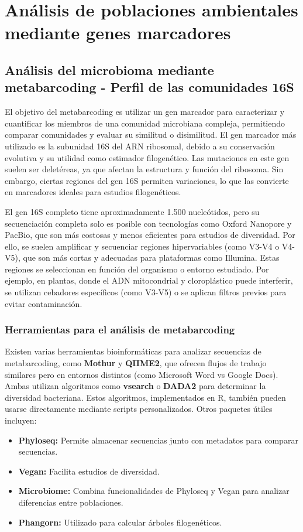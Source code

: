 \chapter{Análisis de poblaciones ambientales mediante genes marcadores}
\section{Análisis del microbioma mediante metabarcoding - Perfil de las comunidades 16S}
El objetivo del metabarcoding es utilizar un gen marcador para caracterizar y cuantificar los miembros de una comunidad microbiana compleja, permitiendo comparar comunidades y evaluar su similitud o disimilitud. El gen marcador más utilizado es la subunidad 16S del ARN ribosomal, debido a su conservación evolutiva y su utilidad como estimador filogenético. Las mutaciones en este gen suelen ser deletéreas, ya que afectan la estructura y función del ribosoma. Sin embargo, ciertas regiones del gen 16S permiten variaciones, lo que las convierte en marcadores ideales para estudios filogenéticos.

El gen 16S completo tiene aproximadamente 1.500 nucleótidos, pero su secuenciación completa solo es posible con tecnologías como Oxford Nanopore y PacBio, que son más costosas y menos eficientes para estudios de diversidad. Por ello, se suelen amplificar y secuenciar regiones hipervariables (como V3-V4 o V4-V5), que son más cortas y adecuadas para plataformas como Illumina. Estas regiones se seleccionan en función del organismo o entorno estudiado. Por ejemplo, en plantas, donde el ADN mitocondrial y cloroplástico puede interferir, se utilizan cebadores específicos (como V3-V5) o se aplican filtros previos para evitar contaminación.

\subsection{Herramientas para el análisis de metabarcoding}
Existen varias herramientas bioinformáticas para analizar secuencias de metabarcoding, como \textbf{Mothur} y \textbf{QIIME2}, que ofrecen flujos de trabajo similares pero en entornos distintos (como Microsoft Word vs Google Docs). Ambas utilizan algoritmos como \textbf{vsearch} o \textbf{DADA2} para determinar la diversidad bacteriana. Estos algoritmos, implementados en R, también pueden usarse directamente mediante scripts personalizados. Otros paquetes útiles incluyen:
\begin{itemize}
\item \textbf{Phyloseq:} Permite almacenar secuencias junto con metadatos para comparar secuencias.
\item \textbf{Vegan:} Facilita estudios de diversidad.
\item \textbf{Microbiome:} Combina funcionalidades de Phyloseq y Vegan para analizar diferencias entre poblaciones.
\item \textbf{Phangorn:} Utilizado para calcular árboles filogenéticos.
\end{itemize}

